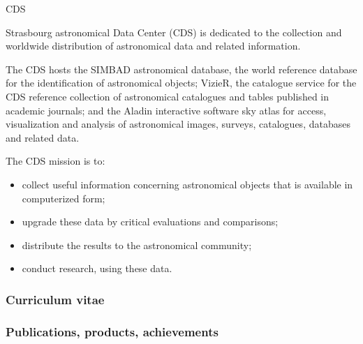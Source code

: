 \begin{sitedescription}{CDS}

Strasbourg astronomical Data Center (CDS) is dedicated to the collection and worldwide distribution of astronomical data and related information.

The CDS hosts the SIMBAD astronomical database, the world reference database for the identification of astronomical objects; VizieR, the catalogue service for the CDS reference collection of astronomical catalogues and tables published in academic journals; and the Aladin interactive software sky atlas for access, visualization and analysis of astronomical images, surveys, catalogues, databases and related data.

The CDS mission is to:

\begin{itemize}
  \item collect useful information concerning astronomical objects that is available in computerized form;
  \item upgrade these data by critical evaluations and comparisons;
  \item distribute the results to the astronomical community;
  \item conduct research, using these data.
\end{itemize}

%

\subsubsection*{Curriculum vitae}


%
%





\subsubsection*{Publications, products, achievements}


\end{sitedescription}
